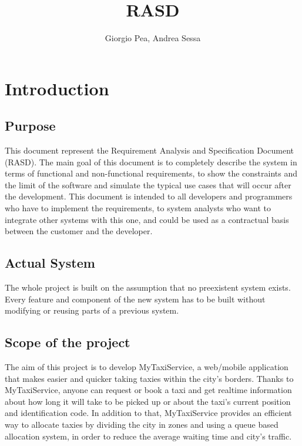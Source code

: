 \documentclass[11pt]{article} %
\title{RASD}
\author{Giorgio Pea, Andrea Sessa}
\begin{document}
\maketitle
\newpage

\tableofcontents

\newpage

\section{Introduction}
  \subsection{Purpose}
    This document represent the Requirement Analysis and Specification Document
    (RASD). The main goal of this document is to completely describe the system
    in terms of functional and non-functional requirements, to show the constraints and the limit
    of the software and simulate the typical use cases that will occur after the
    development. This document is intended to all developers and programmers who
    have to implement the requirements, to system analysts who want to integrate
    other systems with this one, and could be used as a contractual basis between
    the customer and the developer.

  \subsection{Actual System}
    The whole project is built on the assumption that no preexistent system exists.
    Every feature and component of the new system has to be built without modifying
    or reusing parts of a previous system.

  \subsection{Scope of the project}
    The aim of this project is to develop MyTaxiService, a web/mobile application that makes easier and quicker taking taxies
    within the city's borders.
    Thanks to MyTaxiService, anyone can request or book a taxi and get realtime information
    about how long it will take to be picked up or about the taxi's current position and identification
    code.
    In addition to that, MyTaxiService provides an efficient way to allocate taxies by dividing the
    city in zones and using a queue based allocation system, in order to reduce the average
    waiting time and city's traffic.
\end{document}
